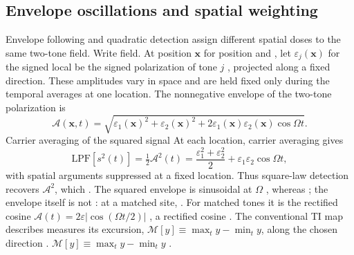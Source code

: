 \documentclass[11pt,a4paper]{article}
\providecommand{\DIFaddtex}[1]{{\protect\color{blue} \sf #1}} %
\providecommand{\DIFdeltex}[1]{{\protect\color{red} \scriptsize #1}} %
\providecommand{\DIFaddbegin}{} %
\providecommand{\DIFaddend}{} %
\providecommand{\DIFdelbegin}{} %
\providecommand{\DIFdelend}{} %
\providecommand{\DIFadd}[1]{\texorpdfstring{\DIFaddtex{#1}}{#1}} %
\providecommand{\DIFdel}[1]{\texorpdfstring{\DIFdeltex{#1}}{}} %
\begin{document}
\subsection{Envelope oscillations and spatial weighting}\label{sec:envelope}
Envelope following and quadratic detection assign different spatial doses
to the same \DIFdelbegin \DIFdel{two-tone field. Write }\DIFdelend \DIFaddbegin \DIFadd{field. At position }\DIFaddend $\mathbf x$\DIFdelbegin \DIFdel{for position and }\DIFdelend \DIFaddbegin \DIFadd{, let }\DIFaddend $\varepsilon_j(\mathbf x)$ \DIFdelbegin \DIFdel{for the signed local
}\DIFdelend \DIFaddbegin \DIFadd{be
the signed }\DIFaddend polarization of tone $j$ \DIFdelbegin \DIFdel{, projected }\DIFdelend along a fixed direction. \DIFdelbegin \DIFdel{These amplitudes vary
in space and are held fixed only during the temporal averages at one location.
}\DIFdelend The nonnegative
envelope \DIFaddbegin \DIFadd{of the two-tone polarization }\DIFaddend is
\[
\mathcal A(\mathbf x,t)=\sqrt{\varepsilon_1(\mathbf x)^2+\varepsilon_2(\mathbf x)^2
+2\varepsilon_1(\mathbf x)\varepsilon_2(\mathbf x)\cos\Omega t}.
\]
\DIFdelbegin \DIFdel{Carrier averaging of the squared signal }\DIFdelend \DIFaddbegin \DIFadd{At each location, carrier averaging }\DIFaddend gives
\begin{equation}
\mathrm{LPF}[s^2(t)]=\tfrac12\mathcal A^2(t)
=\frac{\varepsilon_1^2+\varepsilon_2^2}{2}+\varepsilon_1\varepsilon_2\cos\Omega t,
\label{eq:sqenv}
\end{equation}
with spatial arguments suppressed\DIFdelbegin \DIFdel{at a fixed location. Thus square-law detection recovers $\mathcal A^2$,
which }\DIFdelend \DIFaddbegin \DIFadd{. The squared envelope }\DIFaddend is sinusoidal at
$\Omega$\DIFdelbegin \DIFdel{, whereas }\DIFdelend \DIFaddbegin \DIFadd{; }\DIFaddend the envelope itself is not\DIFdelbegin \DIFdel{: at a matched site, }\DIFdelend \DIFaddbegin \DIFadd{. For matched tones it is the rectified
cosine }\DIFaddend $\mathcal A(t)=2\varepsilon|\cos(\Omega t/2)|$\DIFdelbegin \DIFdel{, a rectified
cosine }\DIFdelend .
The conventional TI map \DIFdelbegin \DIFdel{describes }\DIFdelend \DIFaddbegin \DIFadd{measures }\DIFaddend its excursion,
\DIFdelbegin \DIFdel{$\mathcal{M}[y]\equiv\max_t y-\min_t y$, along the chosen direction \cite{grossman2017}.
}\DIFdelend \DIFaddbegin \DIFadd{$\mathcal M[y]\equiv\max_t y-\min_t y$ \cite{grossman2017}.
}
\end{document}
